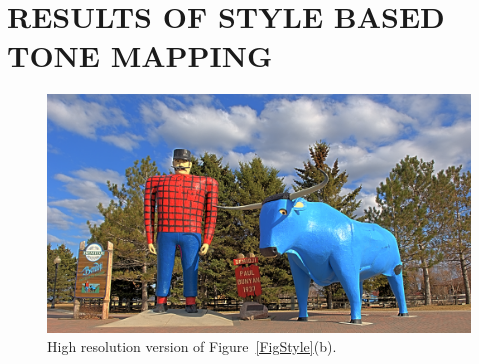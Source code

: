\chapter{RESULTS OF STYLE BASED TONE MAPPING}
\label{app:results}


\begin{figure}
\begin{center}
\includegraphics[width=\textwidth]{figures/chapter5/style_based/PaulBunyan_hdrcandy_v2.png}
\caption{High resolution version of Figure~\ref{FigStyle}(b).}
\end{center}
\end{figure}

